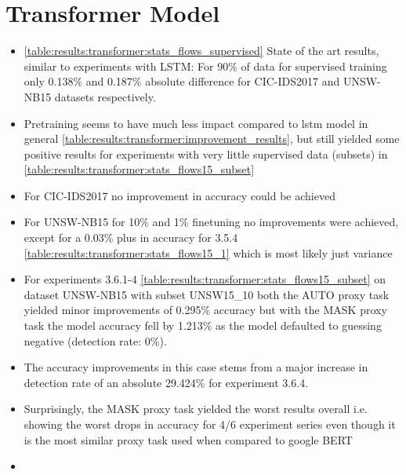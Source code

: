 \section{Transformer Model} \label{sec:results:transformer}









\begin{itemize}
	\item \ref{table:results:transformer:stats_flows_supervised} State of the art results, similar to experiments with LSTM: For 90\% of data for supervised training only 0.138\% and 0.187\% absolute difference for CIC-IDS2017 and UNSW-NB15 datasets respectively.
	\item Pretraining seems to have much less impact compared to \gls{lstm} model in general \ref{table:results:transformer:improvement_results}, but still yielded some positive results for experiments with very little supervised data (subsets) in \ref{table:results:transformer:stats_flows15_subset}
	\item For CIC-IDS2017 no improvement in accuracy could be achieved
	\item For UNSW-NB15 for 10\% and 1\% finetuning no improvements were achieved, except for a 0.03\% plus in accuracy for 3.5.4 \ref{table:results:transformer:stats_flows15_1} which is most likely just variance
	\item For experiments 3.6.1-4 \ref{table:results:transformer:stats_flows15_subset} on dataset UNSW-NB15 with subset UNSW15\_10 both the AUTO proxy task yielded minor improvements of 0.295\% accuracy but with the MASK proxy task the model accuracy fell by 1.213\% as the model defaulted to guessing negative (detection rate: 0\%).
	\item The accuracy improvements in this case stems from a major increase in detection rate of an absolute 29.424\% for experiment 3.6.4.
	\item Surprisingly, the MASK proxy task yielded the worst results overall i.e. showing the worst drops in accuracy for 4/6 experiment series even though it is the most similar proxy task used when compared to google BERT
	\item 
\end{itemize}

